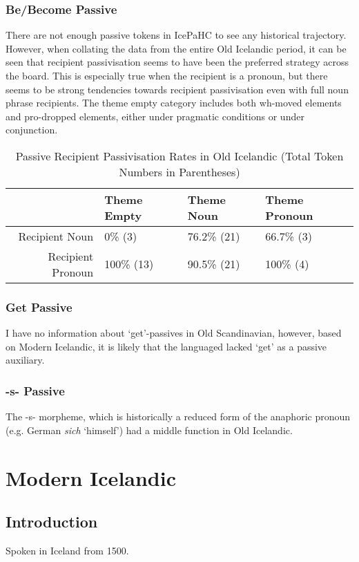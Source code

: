 \subsubsection{Be/Become Passive}
There are not enough passive tokens in IcePaHC to see any historical trajectory. However, when collating the data from the entire Old Icelandic period, it can be seen that recipient passivisation seems to have been the preferred strategy across the board. This is especially true when the recipient is a pronoun, but there seems to be strong tendencies towards recipient passivisation even with full noun phrase recipients. The theme empty category includes both wh-moved elements and pro-dropped elements, either under pragmatic conditions or under conjunction.

\begin{table}[ht]
\centering
\begin{tabular}{rlll}
  \hline
 & Theme Empty & Theme Noun & Theme Pronoun \\ 
  \hline
Recipient Noun & 0\% (3) & 76.2\% (21) & 66.7\% (3) \\ 
  Recipient Pronoun & 100\% (13) & 90.5\% (21) & 100\% (4) \\ 
   \hline
\end{tabular}
\caption{Passive Recipient Passivisation Rates in Old Icelandic (Total Token Numbers in Parentheses)} 
\end{table}



\subsubsection{Get Passive}
I have no information about `get'-passives in Old Scandinavian, however, based on Modern Icelandic, it is likely that the languaged lacked `get' as a passive auxiliary.
\subsubsection{-s- Passive}
The -s- morpheme, which is historically a reduced form of the anaphoric pronoun (e.g. German \emph{sich} `himself') had a middle function in Old Icelandic.

\section{Modern Icelandic}\label{sec:Icelandic}
\subsection{Introduction}
Spoken in Iceland from 1500.
